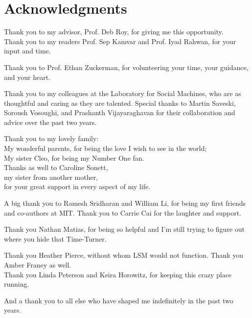  
\section*{Acknowledgments}

Thank you to my advisor, Prof. Deb Roy, for giving me this opportunity.\\
Thank you to my readers Prof. Sep Kamvar and Prof. Iyad Rahwan, for your input and time.

Thank you to Prof. Ethan Zuckerman, for volunteering your time, your guidance, and your heart. 

Thank you to my colleagues at the Laboratory for Social Machines, who are as thoughtful and caring as they are talented. Special thanks to Martin Saveski, Soroush Vosoughi, and Prashanth Vijayaraghavan for their collaboration and advice over the past two years.

Thank you to my lovely family: \\
My wonderful parents, for being the love I wish to see in the world;  \\
My sister Cleo, for being my Number One fan.  \\
Thanks as well to Caroline Sonett, \\
my sister from another mother, \\
for your great support in every aspect of my life.
  
A big thank you to Ramesh Sridharan and William Li, for being my first friends and co-authors at MIT. Thank you to Carrie Cai for the laughter and support.

Thank you Nathan Matias, for being so helpful and I'm still trying to figure out where you hide that Time-Turner.

Thank you Heather Pierce, without whom LSM would not function. Thank you Amber Franey as well.\\
Thank you Linda Peterson and Keira Horowitz, for keeping this crazy place running.

And a thank you to all else who have shaped me indefinitely in the past two years.

 
\afterpage{\blankpage}


